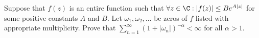 Suppose that $f(z)$ is an entire function such that $\forall z\in
\C:|f(z)|\leq Be^{A|z|}$ for some positive constants $A$ and $B$. Let
$\omega_1,\omega_2,\ldots $ be zeros of $f$ listed with appropriate
multiplicity. Prove that
$\sum_{n=1}^{\infty}(1+|\omega_n|)^{-\alpha}<\infty$ for all
$\alpha>1$.
